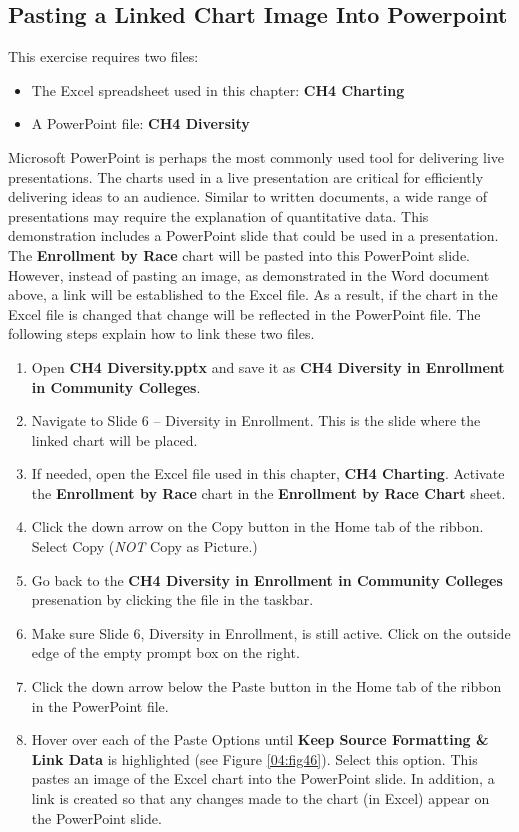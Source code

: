 \subsection{Pasting a Linked Chart Image Into Powerpoint}

This exercise requires two files:

\begin{itemize}
	\item The Excel spreadsheet used in this chapter: \textbf{CH4 Charting}
	\item A PowerPoint file: \textbf{CH4 Diversity}
\end{itemize}

Microsoft PowerPoint is perhaps the most commonly used tool for delivering live presentations. The charts used in a live presentation are critical for efficiently delivering ideas to an audience. Similar to written documents, a wide range of presentations may require the explanation of quantitative data. This demonstration includes a PowerPoint slide that could be used in a presentation. The \textbf{Enrollment by Race} chart will be pasted into this PowerPoint slide. However, instead of pasting an image, as demonstrated in the Word document above, a link will be established to the Excel file. As a result, if the chart in the Excel file is changed that change will be reflected in the PowerPoint file. The following steps explain how to link these two files.

\begin{enumerate}
	\item Open \textbf{CH4 Diversity.pptx} and save it as \textbf{CH4 Diversity in Enrollment in Community Colleges}.
	\item Navigate to Slide $ 6 $ – Diversity in Enrollment. This is the slide where the linked chart will be placed.
	\item If needed, open the Excel file used in this chapter, \textbf{CH4 Charting}. Activate the \textbf{Enrollment by Race} chart in the \textbf{Enrollment by Race Chart} sheet.
	\item Click the down arrow on the Copy button in the Home tab of the ribbon. Select Copy (\textit{NOT} Copy as Picture.)
	\item Go back to the \textbf{CH4 Diversity in Enrollment in Community Colleges} presenation by clicking the file in the taskbar.
	\item Make sure Slide 6, Diversity in Enrollment, is still active. Click on the outside edge of the empty prompt box on the right.
	\item Click the down arrow below the Paste button in the Home tab of the ribbon in the PowerPoint file.
	\item Hover over each of the Paste Options until \textbf{Keep Source Formatting \& Link Data} is highlighted (see Figure \ref{04:fig46}). Select this option. This pastes an image of the Excel chart into the PowerPoint slide. In addition, a link is created so that any changes made to the chart (in Excel) appear on the PowerPoint slide.
\end{enumerate}

